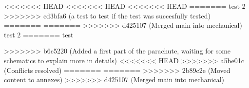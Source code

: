 <<<<<<< HEAD
<<<<<<< HEAD
<<<<<<< HEAD
=======
test 2
>>>>>>> cd3bfa6 (a test to test if the test was succesfully tested)
=======
=======
>>>>>>> d425107 (Merged main into mechanical)
test 2
=======
test


>>>>>>> b6c5220 (Added a first part of the parachute, waiting for some schematics to explain more in details)
<<<<<<< HEAD
>>>>>>> a5be01c (Conflicts resolved)
=======
=======
>>>>>>> 2b89c2e (Moved content to annexes)
>>>>>>> d425107 (Merged main into mechanical)
